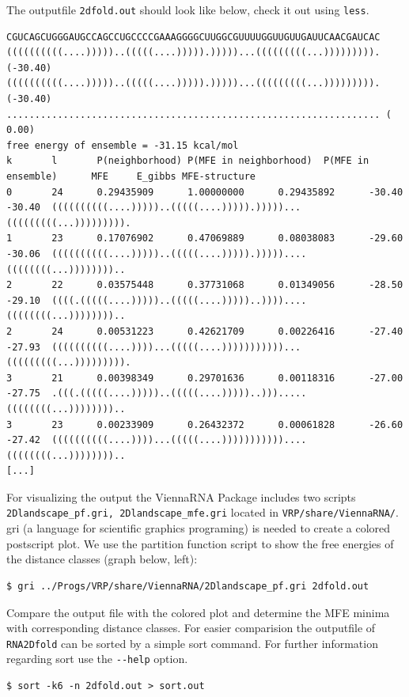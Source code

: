 \documentclass[]{article}
\begin{document}
The outputfile \texttt{2dfold.out} should look like below, check it out
using \texttt{less}.

\begin{verbatim}
CGUCAGCUGGGAUGCCAGCCUGCCCCGAAAGGGGCUUGGCGUUUUGGUUGUUGAUUCAACGAUCAC
((((((((((....)))))..(((((....))))).)))))...(((((((((...))))))))). (-30.40)
((((((((((....)))))..(((((....))))).)))))...(((((((((...))))))))). (-30.40) 
.................................................................. (  0.00) 
free energy of ensemble = -31.15 kcal/mol
k       l       P(neighborhood) P(MFE in neighborhood)  P(MFE in ensemble)      MFE     E_gibbs MFE-structure
0       24      0.29435909      1.00000000      0.29435892      -30.40  -30.40  ((((((((((....)))))..(((((....))))).)))))...(((((((((...))))))))).
1       23      0.17076902      0.47069889      0.08038083      -29.60  -30.06  ((((((((((....)))))..(((((....))))).)))))....((((((((...))))))))..
2       22      0.03575448      0.37731068      0.01349056      -28.50  -29.10  ((((.(((((....)))))..(((((....)))))..))))....((((((((...))))))))..
2       24      0.00531223      0.42621709      0.00226416      -27.40  -27.93  ((((((((((....))))...(((((....)))))))))))...(((((((((...))))))))).
3       21      0.00398349      0.29701636      0.00118316      -27.00  -27.75  .(((.(((((....)))))..(((((....)))))..))).....((((((((...))))))))..
3       23      0.00233909      0.26432372      0.00061828      -26.60  -27.42  ((((((((((....))))...(((((....)))))))))))....((((((((...))))))))..
[...]
\end{verbatim}

For visualizing the output the ViennaRNA Package includes two scripts
\texttt{2Dlandscape\_pf.gri,\ 2Dlandscape\_mfe.gri} located in
\texttt{VRP/share/ViennaRNA/}. gri (a language for scientific graphics
programing) is needed to create a colored postscript plot. We use the
partition function script to show the free energies of the distance
classes (graph below, left):

\begin{verbatim}
$ gri ../Progs/VRP/share/ViennaRNA/2Dlandscape_pf.gri 2dfold.out
\end{verbatim}

Compare the output file with the colored plot and determine the MFE
minima with corresponding distance classes. For easier comparision the
outputfile of \texttt{RNA2Dfold} can be sorted by a simple sort command.
For further information regarding sort use the \texttt{-\/-help} option.

\begin{verbatim}
$ sort -k6 -n 2dfold.out > sort.out
\end{verbatim}
\end{document}
